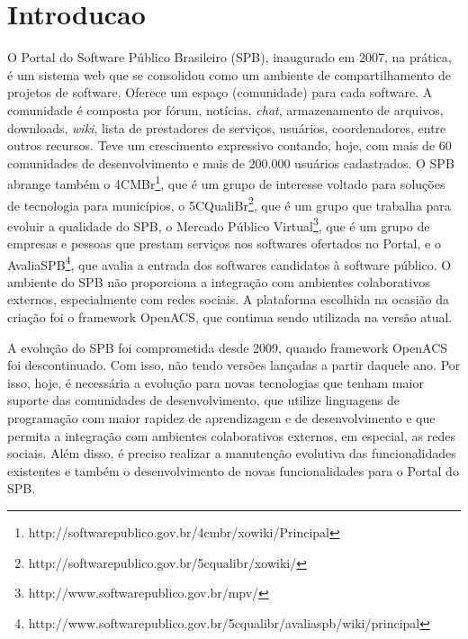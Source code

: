 \section{Introducao}
\label{sec:introducao}

O Portal do Software Público Brasileiro (SPB), inaugurado em 2007, na prática,
é um sistema web que se consolidou como um ambiente de compartilhamento de
projetos de software.
%
Oferece um espaço (comunidade) para cada software. A comunidade é composta por
fórum, notícias, {\it chat}, armazenamento de arquivos, downloads, {\it wiki}, lista de
prestadores de serviços, usuários, coordenadores, entre outros recursos.
%
Teve um crescimento expressivo contando, hoje, com mais de 60 comunidades de
desenvolvimento e mais de 200.000 usuários cadastrados.
%
O SPB abrange também o 4CMBr\footnote{http://softwarepublico.gov.br/4cmbr/xowiki/Principal}, que é um grupo de interesse voltado para soluções
de tecnologia para municípios, o 5CQualiBr\footnote{http://softwarepublico.gov.br/5cqualibr/xowiki/}, que é um grupo que trabalha para
evoluir a qualidade do SPB, o Mercado Público Virtual\footnote{http://www.softwarepublico.gov.br/mpv/}, que é um
grupo de empresas e pessoas que prestam serviços nos softwares ofertados no
Portal, e o AvaliaSPB\footnote{http://www.softwarepublico.gov.br/5cqualibr/avaliaspb/wiki/principal}, que avalia a entrada dos softwares candidatos à software
público.
%
O ambiente do SPB não proporciona a integração com ambientes colaborativos
externos, especialmente com redes sociais. A plataforma escolhida na ocasião da
criação foi o framework OpenACS, que continua sendo utilizada na versão atual.


A evolução do SPB foi comprometida desde 2009, quando framework OpenACS foi 
descontinuado. Com isso, não tendo versões lançadas a partir daquele ano.
%
Por isso, hoje, é necessária a evolução para novas tecnologias que tenham maior
suporte das comunidades de desenvolvimento, que utilize linguagens de programação
com maior rapidez de aprendizagem e de desenvolvimento e que permita a integração
com ambientes colaborativos externos, em especial, as redes sociais.
%
Além disso, é preciso realizar a manutenção evolutiva das funcionalidades
existentes e também o desenvolvimento de novas funcionalidades para o Portal
do SPB.


